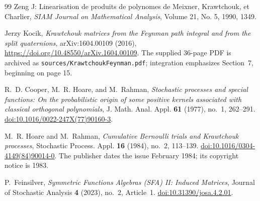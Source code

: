 \begin{thebibliography}{99}
 Zeng J: Linearisation de produits de polynomes de Meixner, Krawtchouk, et Charlier, \emph{SIAM Journal on Mathematical Analysis}, Volume 21, No. 5, 1990, 1349.

Jerzy Kocik, \emph{Krawtchouk matrices from the Feynman path integral and
from the split quaternions}, arXiv:1604.00109 (2016),
\url{https://doi.org/10.48550/arXiv.1604.00109}.
The supplied 36-page PDF is archived as
\texttt{sources/KrawtchoukFeynman.pdf}; integration emphasizes Section~7, beginning on page 15.

R.~D. Cooper, M.~R. Hoare, and M.~Rahman,
\emph{Stochastic processes and special functions: On the probabilistic
origin of some positive kernels associated with classical orthogonal
polynomials}, J. Math. Anal. Appl. \textbf{61} (1977), no.~1, 262--291.
\href{https://doi.org/10.1016/0022-247X(77)90160-3}{doi:10.1016/0022-247X(77)90160-3}.

M.~R. Hoare and M.~Rahman, \emph{Cumulative Bernoulli trials and
Krawtchouk processes}, Stochastic Process. Appl. \textbf{16} (1984),
no.~2, 113--139.
\href{https://doi.org/10.1016/0304-4149(84)90014-0}{doi:10.1016/0304-4149(84)90014-0}.
The publisher dates the issue February 1984; its copyright notice is 1983.

P.~Feinsilver, \emph{Symmetric Functions Algebras (SFA) II: Induced
Matrices}, Journal of Stochastic Analysis \textbf{4} (2023), no.~2,
Article~1.
\href{https://doi.org/10.31390/josa.4.2.01}{doi:10.31390/josa.4.2.01}.

\end{thebibliography}
